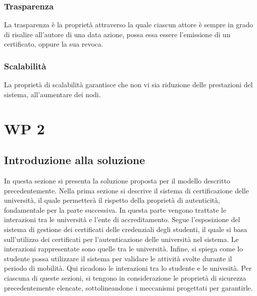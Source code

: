 \documentclass[a4paper,12pt]{article}
\begin{document}
\subsubsection{Trasparenza}
La trasparenza è la proprietà attraverso la quale ciascun attore è sempre in grado di risalire all'autore di una data azione, possa essa essere l'emissione di un certificato, oppure la sua revoca.
\subsubsection{Scalabilità}
La proprietà di scalabilità garantisce che non vi sia riduzione delle prestazioni del sistema, all'aumentare dei nodi.



\newpage
\section{WP 2}
\subsection{Introduzione alla soluzione}
In questa sezione si presenta la soluzione proposta per il modello descritto precedentemente.
\newline Nella prima sezione si descrive il sistema di certificazione delle università, il quale permetterà il rispetto della proprietà di autenticità, fondamentale per la parte successiva. In questa parte vengono trattate le interazioni tra le università e l'ente di accreditamento.  
\newline Segue l'esposizione del sistema di gestione dei certificati delle credenziali degli studenti, il quale si basa sull'utilizzo dei certificati per l'autenticazione delle università nel sistema. Le interazioni rappresentate sono quelle tra le università. 
\newline Infine, si spiega come lo studente possa utilizzare il sistema per validare le attività svolte durante il periodo di mobilità. Qui ricadono le interazioni tra lo studente e le univesità. 
\newline Per ciascuna di queste sezioni, si tengono in considerazione le proprietà di sicurezza precedentemente elencate, sottolineandone i meccanismi progettati per garantirle.
\end{document}
